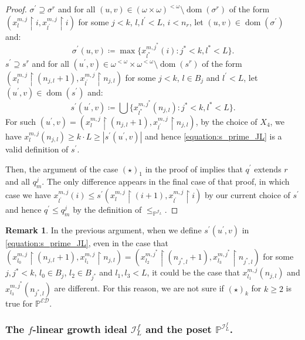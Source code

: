 \documentclass[a4paper,12pt]{amsart}
\theoremstyle{definition}
\newtheorem{rem}[thm]{Remark}
\numberwithin{thm}{section}
\numberwithin{equation}{section}
\newcommand{\fsq}{\omega^{<\omega}}
\newcommand{\on}{\mathpunct{\upharpoonright}}
\DeclareMathOperator{\dom}{dom}
\newcommand{\ed}{\mathcal{ED}}
\newcommand{\I}{\mathscr{I}}
\newcommand{\J}{\mathscr{J}}
\newcommand{\dif}{\mathbb{P}^{\I_L^f}}
\newcommand{\ILf}{\I_{L}^f}
\newcommand{\posetED}{\mathbb{P}^{\ed}}
\newcommand{\posetJL}{\mathbb{P}^{\J_L}}
\begin{document}
\begin{proof}
        $\sigma^\prime\supseteq \sigma^r$ and for all $(u,v)\in(\omega\times\omega)^{<\omega}\setminus \dom (\sigma^r)$ of the form $(x^{m,j}_{l}\on i, x^{m,j}_{l^\prime}\on i)$ for some $j<k$, $l,l^\prime<L$, $i<n_r$, let $(u,v)\in\dom(\sigma^\prime)$ and:
        \begin{equation}
            \sigma^\prime(u,v)\coloneqq\max\{x^{m,j^*}_{l^*}(i):j^*<k,l^*<L\}. 
        \end{equation}
        $s^\prime\supseteq s^r$ and for all $(u^\prime,v)\in\fsq\times\fsq\setminus \dom (s^r)$ of the form $(x^{m,j}_{l}\on (n_{j,l}+1), x^{m,j}_{l^\prime}\on n_{j,l})$ for some $j<k$, $l\in B_j$ and $l^\prime<L$, let $(u^\prime,v)\in\dom(s^\prime)$ and:
        \begin{equation}
            \label{equation:s_prime_JL}
            s^\prime(u^\prime,v)\coloneqq\bigcup\{x^{m,j^*}_{l^*}(n_{j,l}):j^*<k,l^*<L\}.
        \end{equation}
        For such $(u^\prime,v)=(x^{m,j}_{l}\on (n_{j,l}+1), x^{m,j}_{l^\prime}\on n_{j,l})$, by the choice of $X_4$, we have $x^{m,j}_{l} (n_{j,l})\geq k\cdot L\geq |s^\prime(u^\prime,v)|$ and hence \eqref{equation:s_prime_JL} is a valid definition of $s^\prime$.
    
        
        Then, the argument of the case $(\star)_1$ in the proof of  implies that $q^\prime$ extends $r$ and all $q^j_m$. The only difference appears in the final case of that proof, in which case we have $x^{m,j}_{l^\prime}(i)\leq s^\prime(x^{m,j}_l\on(i+1),x^{m,j}_{l^\prime}\on i)$ by our current choice of $s^\prime$ and hence $q^\prime\leq q^j_m$ by the definition of $\leq_{\posetJL}$.
    \end{proof}
    
    \begin{rem}\label{rem:posetED_UF_limits}
        In the previous argument, when we define $s^\prime(u^\prime,v)$ in  \eqref{equation:s_prime_JL}, even in the case that $(x^{m,j}_{l_0}\on (n_{j,l}+1), x^{m,j}_{l_1}\on n_{j,l})=(x^{m,j^*}_{l_2}\on (n_{j^*,l}+1), x^{m,j^*}_{l_3}\on n_{j^*,l})$ for some $j,j^*<k$, $l_0\in B_j$, $l_2\in B_{j^*}$ and $l_1,l_3<L$, it could be the case that $x^{m,j}_{l_1}(n_{j,l})$ and $ x^{m,j^*}_{l_3}(n_{j^*,l})$ are different. For this reason, we are not sure if $(\star)_k$ for $k\geq2$ is true for $\posetED$.
    \end{rem}


    \subsubsection{The $f$-linear growth ideal $\ILf$ and the poset $\dif$.}
    
\end{document}
